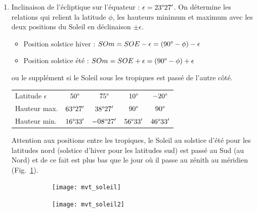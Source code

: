 \documentclass[a4paper,10pt]{report}
\renewcommand{\deg}{\ensuremath{\degree}}
\begin{document}
\begin{Answer}
  \begin{enumerate}
  \item Inclinaison de l'écliptique sur l'équateur :
    $\epsilon=23\deg27'$. On détermine les relations qui relient la
    latitude $\phi$, les hauteurs minimum et maximum avec les deux
    positions du Soleil en déclinaison $\pm \epsilon$.
    \begin{itemize}
    \item Position solstice hiver : $SOm = SOE - \epsilon =
      (90\deg-\phi) -\epsilon$
    \item Position solstice été : $SOm = SOE + \epsilon =
      (90\deg-\phi) +\epsilon$
    \end{itemize}
    ou le supplément si le Soleil sous les tropiques est passé de
    l'autre côté.
    \begin{center}
      \begin{tabular}{lcccc}
        \toprule
        Latitude $\epsilon$ & $50\deg$ & $75\deg$ & $10\deg$ & $-20\deg$ \\
        Hauteur max. & $63\deg27'$ & $38\deg27'$ & $90\deg$ & $90\deg$ \\
        Hauteur min. & $16\deg33'$ & $-08\deg27'$ & $56\deg33'$ & $46\deg33'$ \\
        \bottomrule
      \end{tabular}
    \end{center}
    Attention aux positions entre les tropiques, le Soleil au solstice
    d'été pour les latitudes nord (solstice d'hiver pour les latitudes
    sud) est passé au Sud (au Nord) et de ce fait est plus bas que le
    jour où il passe au zénith au méridien (Fig.~\ref{mvtsolaire}).

    \begin{figure}
      \centering
      \begin{subfigure}[b]{0.45\textwidth}
        \centering
        \texttt{[image: mvt\_soleil]}
        \caption{}
        \label{mvtsolaire}
      \end{subfigure}
      \begin{subfigure}[b]{0.45\textwidth}
        \centering
        \texttt{[image: mvt\_soleil2]}
        \caption{}
        \label{mvtsolaire2}
      \end{subfigure}
      \caption{}
    \end{figure}


\end{enumerate}
\end{Answer}
\end{document}
